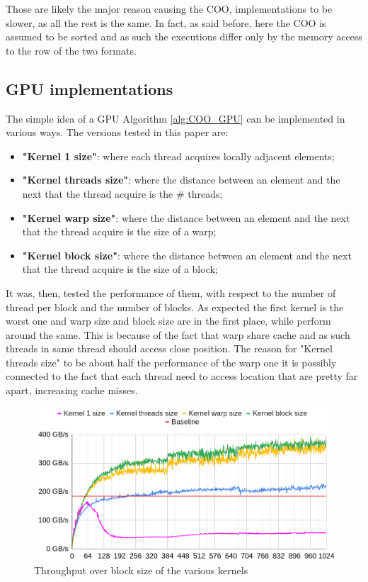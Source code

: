 \documentclass[conference]{IEEEtran}
\begin{document}
Those are likely the major reason causing the COO, implementations to be slower, as all the rest is the same. In fact, as said before, here the COO is assumed to be sorted and as such the executions differ only by the memory access to the row of the two formats.

\subsection{GPU implementations}
The simple idea of a GPU Algorithm \ref{alg:COO_GPU} can be implemented in various ways. The versions tested in this paper are:
\begin{itemize}
	\item \textbf{"Kernel 1 size"}: where each thread acquires locally adjacent elements;
	\item \textbf{"Kernel threads size"}: where the distance between an element and the next that the thread acquire is the \# threads;
	\item \textbf{"Kernel warp size"}: where the distance between an element and the next that the thread acquire is the size of a warp;
	\item \textbf{"Kernel block size"}: where the distance between an element and the next that the thread acquire is the size of a block;
\end{itemize}

It was, then, tested the performance of them, with respect to the number of thread per block and the number of blocks. As expected the first kernel is the worst one and warp size and block size are in the first place, while perform around the same. This is because of the fact that warp share cache and as such threads in same thread should access close position. The reason for "Kernel threads size" to be about half the performance of the warp one it is possibly connected to the fact that each thread need to access location that are pretty far apart, increasing cache misses.

\begin{figure}[h!]
	\centering
	\includegraphics[width=1\linewidth]{data_images/Gb_for_size_block_2}
	\caption{Throughput over block size of the various kernels}
	\label{fig:gbforsizeblock2}
\end{figure}
\end{document}
